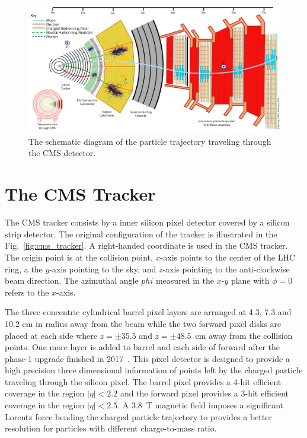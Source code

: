 \begin{figure}[ht]
  \begin{center}
    \includegraphics[width=1\textwidth]{figures/detector/CMS_particle_trajectory.png}
  \end{center}
  \caption{The schematic diagram of the particle trajectory traveling through the CMS detector.}
  \label{fig:cms_trajectory}
\end{figure}

\section{The CMS Tracker}
The CMS tracker consists by a inner silicon pixel detector covered by a silicon strip detector. The original configuration of the tracker is illustrated in the Fig.~\ref{fig:cms_tracker}. A right-handed coordinate is used in the CMS tracker. The origin point is at the collision point, $x$-axis points to the center of the LHC ring, a the $y$-axis pointing to the sky, and $z$-axis pointing to the anti-clockwise beam direction. The azimuthal angle $phi$ measured in the $x$-$y$ plane with $\phi=0$ refers to the $x$-axis. 

The three concentric cylindrical barrel pixel layers are arranged at 4.3, 7.3 and 10.2 cm in radius away from the beam while the two forward pixel disks are placed at each side where $z=\pm35.5$ and $z=\pm48.5$~cm away from the collision points. One more layer is added to barrel and each side of forward after the phase-1 upgrade finished in 2017~\cite{TrackerGroupoftheCMS:2020bgg}. This pixel detector is designed to provide a high precision three dimensional information of points left by the charged particle traveling through the silicon pixel. The barrel pixel provides a 4-hit efficient coverage in the region $|\eta|<2.2$ and the forward pixel provides a 3-hit efficient coverage in the region $|\eta|<2.5$. A 3.8~T magnetic field imposes a significant Lorentz force bending the charged particle trajectory to provides a better resolution for particles with different charge-to-mass ratio.

